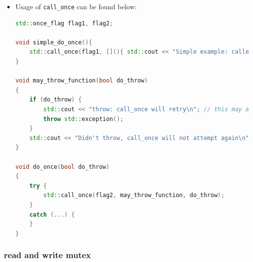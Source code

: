 \documentclass[a4paper,11pt,twoside]{book}
\begin{document}
\begin{itemize}
\item Usage of \texttt{call\_once} can be found below:
\begin{lstlisting}[frame=single, language=c++]	
std::once_flag flag1, flag2;

void simple_do_once(){
	std::call_once(flag1, [](){ std::cout << "Simple example: called once\n"; });
}

void may_throw_function(bool do_throw)
{
	if (do_throw) {
		std::cout << "throw: call_once will retry\n"; // this may appear more than once
		throw std::exception();
	}
	std::cout << "Didn't throw, call_once will not attempt again\n"; // guaranteed once
}

void do_once(bool do_throw)
{
	try {
		std::call_once(flag2, may_throw_function, do_throw);
	}
	catch (...) {
	}
}	
\end{lstlisting}
\end{itemize}

\subsubsection{read and write mutex}
\end{document}
